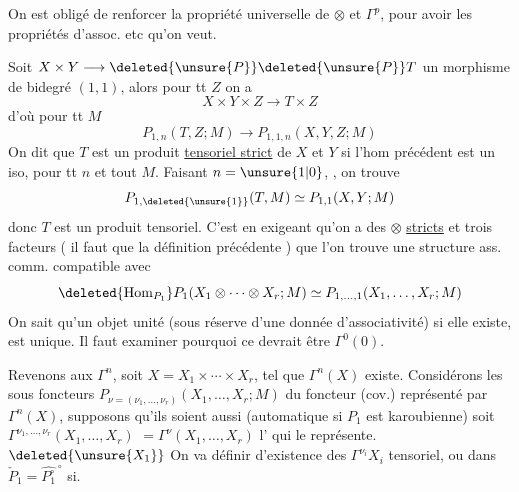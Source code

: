 On est obligé de renforcer la propriété universelle
de $\otimes$ et $\Gamma^p$, pour avoir les propriétés d'assoc. etc
qu'on veut.

Soit $X\times Y\longrightarrow\deleted{\unsure{P}}\deleted{\unsure{P}}T$ un morphisme de bidegré $(1,1)$,
alors pour tt $Z$ on a
\[
X\times Y\times Z\longrightarrow T\times Z
\]
d'où pour tt $M$
\[
P_{1,n}(T,Z;M)\longrightarrow P_{1,1,n}(X,Y,Z;M)
\]
On dit que $T$ est un produit \uline{tensoriel strict} de
$X$ et $Y$ si l'hom précédent est un iso,
pour tt $n$ et tout $M$. Faisant $n=\unsure{1|0}$, , on trouve
\[
P_{1,\deleted{\unsure{1}}}(T,M)\simeq P_{1,1}(X,Y;M)
\]
donc $T$ est un produit tensoriel. C'est
en exigeant qu'on a des $\otimes$ \uline{stricts}  et
trois facteurs ( il faut que la définition précédente
) que l'on
trouve  une structure
ass. comm. compatible avec
\[
\deleted{\operatorname{Hom}_{P_1}} P_1(X_1\otimes\cdots\otimes X_r;M)\simeq P_{1,\ldots,1}(X_1,\ldots,X_r;M)
\]
On sait qu'un objet unité (sous réserve d'une
donnée d'associativité) si elle existe, est unique.
 Il faut examiner pourquoi ce devrait être $\Gamma^0(0)$.

Revenons aux $\Gamma^n$, soit $X=X_1\times\cdots\times X_r$,
tel que $\Gamma^n(X)$ existe. Considérons les
sous foncteurs $P_{\nu=(\nu_1,\ldots,\nu_r)}(X_1,\ldots,X_r;M)$
du foncteur  (cov.) représenté par $\Gamma^n(X)$,
supposons qu'ils soient aussi  (automatique
si $P_1$ est karoubienne) soit $\Gamma^{\nu_1,\ldots,\nu_r}(X_1,\ldots,X_r)$
$=\Gamma^\nu(X_1,\ldots,X_r)$ l' qui le représente. $\deleted{\unsure{X_1}}$
On va définir  d'existence des $\Gamma^{\nu_i}X_i$
 tensoriel,  ou dans $\check{P}_1=\widehat{P_1^\circ}^{\,\circ}$ si.
